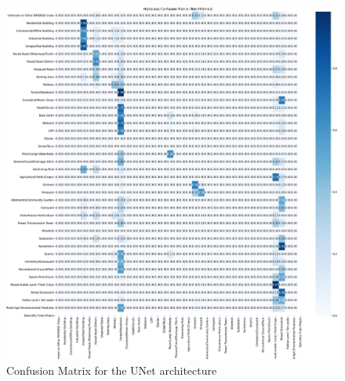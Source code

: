 \documentclass{report}
\begin{document}
\begin{figure}[H]
    \vspace*{-4cm} %
    \hspace*{-4cm} %
    \includegraphics[width=1.7\textwidth]{own_images/low_res_confusion_matrix_UNet_efficienet_b3_20250622_155114.jpg}
    \caption{Confusion Matrix for the UNet architecture}
    \label{fig:con_mat_unet}
\end{figure}
\end{document}
